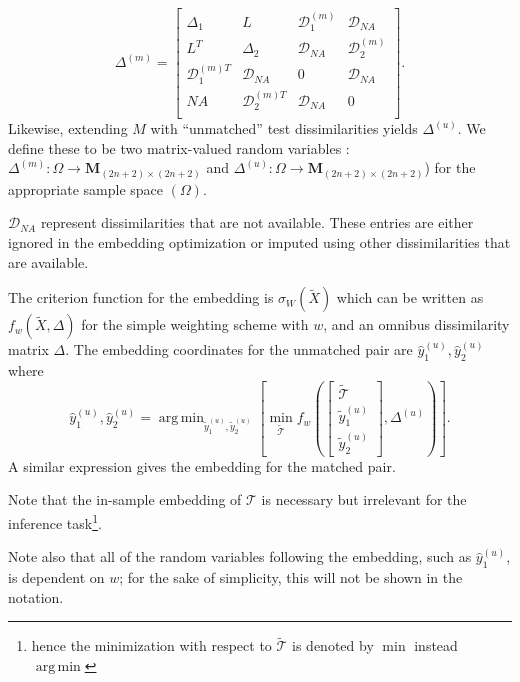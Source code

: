\documentclass[12pt]{article} %
\DeclareMathOperator*{\argmin}{arg\,min}
\newenvironment{remark}[1][Remark]{\begin{trivlist}
\item[\hskip \labelsep {\bfseries #1}]}{\end{trivlist}}
\begin{document}
 \begin{equation}
\Delta^{(m)}=  \left[ \begin{array}{cccc}
         \Delta_1 & L  &  \mathcal{D}_1^{(m)} & \mathcal{D}_{NA}\\
        L^T  & \Delta_2 &  \mathcal{D}_{NA}   & \mathcal{D}_2^{(m)} \\
				\mathcal{D}_1^{(m)T} & \mathcal{D}_{NA}  &  0 & \mathcal{D}_{NA} \\
        NA  & \mathcal{D}_2^{(m)T} & \mathcal{D}_{NA} &0\\
     \end{array}  \right].     \label{aug_omnibus} 
\end{equation} Likewise, extending $M$ with ``unmatched'' test dissimilarities yields $\Delta^{(u)}$.
 We define these to be  two matrix-valued random variables : $\Delta^{(m)}:\Omega \rightarrow \mathbf{M}_{(2n+2)\times (2n+2)} $ and  $\Delta^{(u)}:\Omega \rightarrow \mathbf{M}_{(2n+2)\times (2n+2)} $) for the appropriate sample  space $(\Omega)$.
\begin{remark}
$\mathcal{D}_{NA}$ represent dissimilarities that are not available. These entries are either  ignored in the embedding optimization or imputed using other dissimilarities that are available.
\end{remark}

 The criterion function for the embedding is $\sigma_W(\widetilde{X})$ which can be written as $f_w(\widetilde{X},\Delta)$ for the simple weighting scheme with $w$, and an omnibus dissimilarity matrix $\Delta$. The embedding coordinates for the unmatched pair are  ${\hat{y}_{1}^{(u)},\hat{y}_{2}^{(u)}}$ where
 \[
{\hat{y}_{1}^{(u)},\hat{y}_{2}^{(u)}}
=\argmin_{\widetilde{y}_{1}^{(u)}, \widetilde{y}_{2}^{(u)}}\left[\min_{\widetilde{\mathcal{T}}}
{f_w\left(
\left[
\begin{array}{c}
{\widetilde{\mathcal{T}}} \\
\widetilde{y}_{1}^{(u)} \\
\widetilde{y}_{2}^{(u)}
\end {array}
\right]
,
\Delta^{(u)}
\right)
}
\right].
\]
A similar expression gives the embedding for the matched pair.
\begin{remark}
 Note that the in-sample embedding of $\mathcal{T}$ is necessary but irrelevant for the inference task\footnote{\! hence the minimization with respect to $\widetilde{\mathcal{T}}$ is denoted by  $\min$ instead $\argmin$}. 
\end{remark}
\begin{remark}
 Note also that  all of the random variables following the embedding, such as $\hat{y}_{1}^{(u)}\!$,  is dependent on $w$; for the sake of simplicity, this will not be shown in the notation. 
\end{remark}
\end{document}
